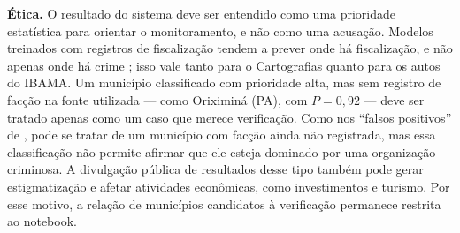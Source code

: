 \documentclass[10pt,a4paper,twocolumn]{article}
\begin{document}
\textbf{Ética.} O resultado do sistema deve ser entendido como uma prioridade estatística para orientar o monitoramento, e não como uma acusação. Modelos treinados com registros de fiscalização tendem a prever onde há fiscalização, e não apenas onde há crime \cite{lum}; isso vale tanto para o Cartografias quanto para os autos do IBAMA. Um município classificado com prioridade alta, mas sem registro de facção na fonte utilizada — como Oriximiná (PA), com $P=0{,}92$ — deve ser tratado apenas como um caso que merece verificação. Como nos ``falsos positivos'' de \cite{campedelli}, pode se tratar de um município com facção ainda não registrada, mas essa classificação não permite afirmar que ele esteja dominado por uma organização criminosa. A divulgação pública de resultados desse tipo também pode gerar estigmatização e afetar atividades econômicas, como investimentos e turismo. Por esse motivo, a relação de municípios candidatos à verificação permanece restrita ao notebook.
\end{document}
